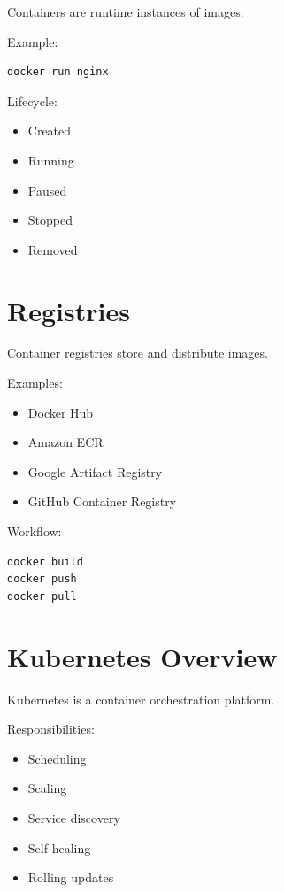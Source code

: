 Containers are runtime instances of images.

Example:

\begin{lstlisting}[style=interviewcode]
docker run nginx
\end{lstlisting}

Lifecycle:

\begin{itemize}
\item Created
\item Running
\item Paused
\item Stopped
\item Removed
\end{itemize}

\section{Registries}

Container registries store and distribute images.

Examples:

\begin{itemize}
\item Docker Hub
\item Amazon ECR
\item Google Artifact Registry
\item GitHub Container Registry
\end{itemize}

Workflow:

\begin{lstlisting}[style=interviewcode]
docker build
docker push
docker pull
\end{lstlisting}

\section{Kubernetes Overview}

Kubernetes is a container orchestration platform.

Responsibilities:

\begin{itemize}
\item Scheduling
\item Scaling
\item Service discovery
\item Self-healing
\item Rolling updates
\end{itemize}

